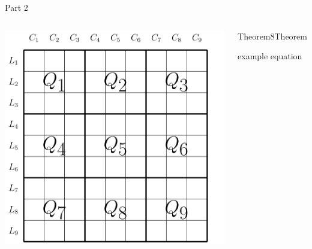 \documentclass[xcolor=dvipsnames,table]{beamer}
\begin{document}
\begin{frame}{Part 2}
	\begin{columns}
		\begin{center}
			\includegraphics[height=.5\textheight]{images/imagem100.jpg}
		\end{center}
		\begin{block}{Theorem8}{Theorem}
		\begin{center}
			{example equation}
		\end{center}
		\end{block}
	\end{columns}
\end{frame}	

\end{document}
